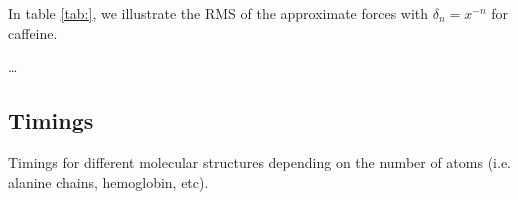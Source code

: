 % 


In table \ref{tab:}, we illustrate the RMS of the approximate forces with $\delta_n = x^{-n}$ 
for caffeine.

\ldots


\subsection{Timings}
Timings for different molecular structures depending on the number of atoms (i.e. alanine chains, hemoglobin, etc).
